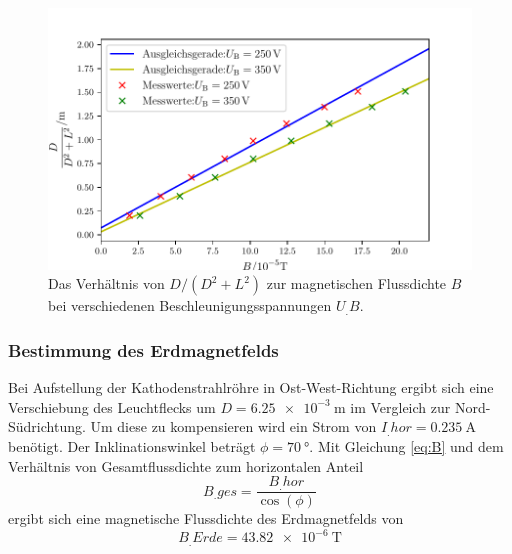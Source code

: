 \begin{figure}
\centering
\includegraphics[width=\linewidth-70pt,height=\textheight-70pt,keepaspectratio]{content/images/GraphMag1.pdf}
\caption{Das Verhältnis von $D/(D^2+L^2)$ zur magnetischen Flussdichte $B$ bei verschiedenen Beschleunigungsspannungen $U_.B$.}\label{fig:Mag}
\end{figure}
\subsubsection{Bestimmung des Erdmagnetfelds}
Bei Aufstellung der Kathodenstrahlröhre in Ost-West-Richtung ergibt sich eine Verschiebung des Leuchtflecks um $D=\SI{6,25e-3}{\metre}$ im Vergleich zur Nord-Südrichtung.
Um diese zu kompensieren wird ein Strom von $I_.{hor}=\SI{0,235}{\ampere}$ benötigt. Der Inklinationswinkel beträgt $\phi=\SI{70}{\degree}$. Mit Gleichung \eqref{eq:B}
und dem Verhältnis von Gesamtflussdichte zum horizontalen Anteil
\[
B_.{ges}= \frac{B_.{hor}}{\cos(\phi)}
\]
ergibt sich eine magnetische Flussdichte des Erdmagnetfelds von
\[
B_.{Erde}=\SI{43,82e-6}{\tesla}
\]
